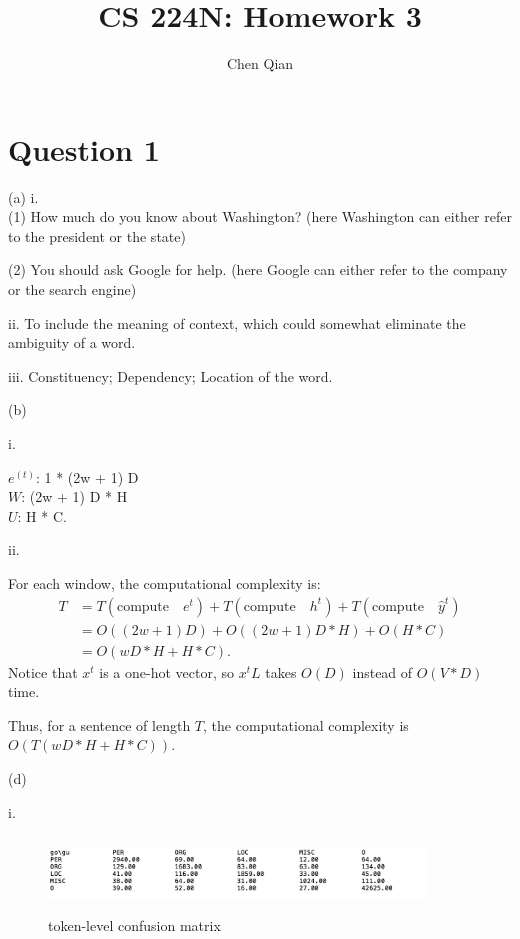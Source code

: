 \documentclass{article}
\theoremstyle{definition}
\theoremstyle{remark}
\numberwithin{equation}{section}
\begin{document}
\title{CS 224N: Homework 3}
\author{Chen Qian}
\date{}
\maketitle

\section*{Question 1}

(a) 
i. \\
(1) How much do you know about Washington? (here Washington can either refer to the president or the state)

(2) You should ask Google for help. (here Google can either refer to the company or the search engine)
 
 \vspace{10pt}
 
 ii. To include the meaning of context, which could somewhat eliminate the ambiguity of a word.
 
 \vspace{10pt}
 
 iii. Constituency; Dependency; Location of the word.
 
 \newpage
 (b) 
 
 i.
 
 $e^{(t)}$: 1 * (2w + 1) D \\
 $W$: (2w + 1) D * H \\
 $U$: H * C.
 
 ii.
 
 For each window, the computational complexity is: 
 \begin{align*}
 T &=  T(\text{compute} \quad e^{t})  + T(\text{compute}  \quad h^{t}) +  T(\text{compute} \quad  \hat{y}^{t}) \\
    &= O((2w + 1)D) + O((2w + 1) D * H) + O(H*C) \\
    &= O ( wD * H + H *C ).
 \end{align*}
Notice that $x^{t}$ is a one-hot vector, so $x^{t}L$ takes $O(D)$ instead of $O(V*D)$ time.

Thus, for a sentence of length $T$, the computational complexity is $O ( T (w D * H + H *C) )$.


\newpage
 (d)
 
 i.
 
 \begin{figure}[H] 
  \centering
 \includegraphics[width=100mm, height=20mm]{fig/token-level-confusion.png}
   \caption{token-level confusion matrix}
   \label{fig: confuse}
 \end{figure}
 
\end{document}
